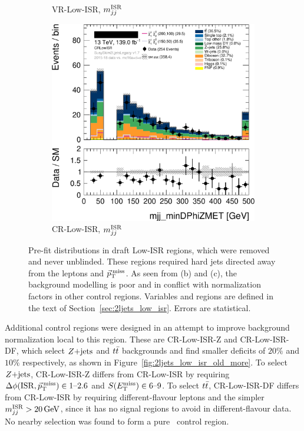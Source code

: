 \begin{figure}[tp]
\begin{subfigure}{0.48\textwidth}
\caption{VR-Low-ISR, $\mwisr$}
\end{subfigure}
\hfill
\begin{subfigure}{0.48\textwidth}
\centering
\includegraphics[width=\textwidth]{figures/2ljets_vrlow_old_crlowisr.png}
\caption{CR-Low-ISR, $\mwisr$}
\end{subfigure}
\caption[
Pre-fit distributions in draft Low-ISR regions, which were removed
]{%
Pre-fit distributions in draft Low-ISR regions, which were removed and never
unblinded.
These regions required hard jets directed away from the leptons and $\ptmiss$.
As seen from (b) and (c), the background modelling is poor and in conflict
with normalization factors in other control regions.
Variables and regions are defined in the text of
Section~\ref{sec:2ljets_low_isr}.
Errors are statistical.
}
\label{fig:2ljets_low_isr_old}
\end{figure}

Additional control regions were designed in an attempt to improve background
normalization local to this region.
These are CR-Low-ISR-Z and CR-Low-ISR-DF, which select $\zjets$ and $\ttbar$
backgrounds and find smaller deficits of $20\%$ and $10\%$ respectively,
as shown in Figure~\ref{fig:2ljets_low_isr_old_more}.
To select $\zjets$, CR-Low-ISR-Z differs from CR-Low-ISR by requiring
$\dphiisrmet \in 1\textrm{--}2.6$ and $\metsig \in 6\textrm{--}9$.
To select $\ttbar$, CR-Low-ISR-DF differs from CR-Low-ISR by requiring
different-flavour leptons and the simpler $\mwisr > 20\,\eV[G]$, since it
has no signal regions to avoid in different-flavour data.
No nearby selection was found to form a pure \diboson\ control region.

